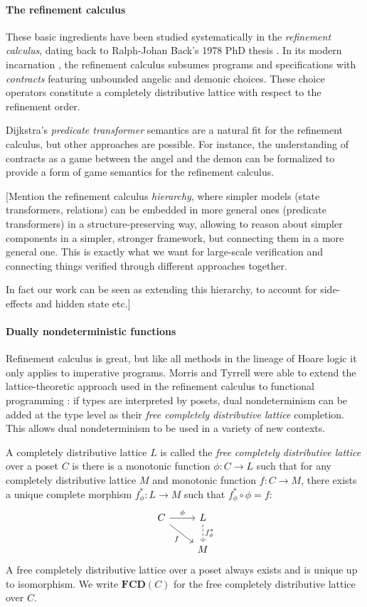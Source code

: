 \documentclass[format=sigplan,authordraft]{acmart}
\begin{document}
\paragraph{The refinement calculus} %

These basic ingredients have been studied systematically
in the \emph{refinement calculus},
dating back to Ralph-Johan Back's 1978 PhD thesis \cite{backthesis}.
In its modern incarnation \cite{refcal},
the refinement calculus
subsumes programs and specifications with \emph{contracts}
featuring unbounded angelic and demonic choices.
These choice operators
constitute a completely distributive lattice
with respect to the refinement order.

Dijkstra's \emph{predicate transformer} semantics
are a natural fit for the refinement calculus,
but other approaches are possible.
For instance,
the understanding of contracts as a game between
the angel and the demon
can be formalized to provide a form of
game semantics for the refinement calculus.

[Mention the refinement calculus \emph{hierarchy},
where simpler models (state transformers, relations)
can be embedded in more general ones
(predicate transformers)
in a structure-preserving way,
allowing to reason about simpler components
in a simpler, stronger framework,
but connecting them in a more general one.
This is exactly what we want for
large-scale verification
and connecting things verified through different approaches
together.

In fact our work can be seen as extending this hierarchy,
to account for side-effects and hidden state etc.]


\paragraph{Dually nondeterministic functions} %

Refinement calculus is great,
but like all methods in the lineage of Hoare logic
it only applies to imperative programs.
Morris and Tyrrell were able to extend
the lattice-theoretic approach used in the refinement calculus
to functional programming
\cite{augtyp,dndf,cspdnd}:
if types are interpreted by posets,
dual nondeterminism can be added at the type level
as their \emph{free completely distributive lattice} completion.
This allows dual nondeterminism to be used
in a variety of new contexts.

A completely distributive lattice $L$ is called the
\emph{free completely distributive lattice}
over a poset $C$ is there is
a monotonic function $\phi : C \rightarrow L$
such that
for any completely distributive lattice $M$
and monotonic function $f : C \rightarrow M$,
there exists a unique complete morphism $f^*_\phi : L \rightarrow M$
such that $f^*_\phi \circ \phi = f$:
\[
  \begin{tikzcd}
    C \arrow[r, "\phi"] \arrow[rd, "f"'] &
    L \arrow[d, "f^*_\phi", dashed] \\ & M
  \end{tikzcd}
\]
A free completely distributive lattice over a poset
always exists and is unique up to isomorphism.
We write $\mathbf{FCD}(C)$ for
the free completely distributive lattice over $C$.
\end{document}
